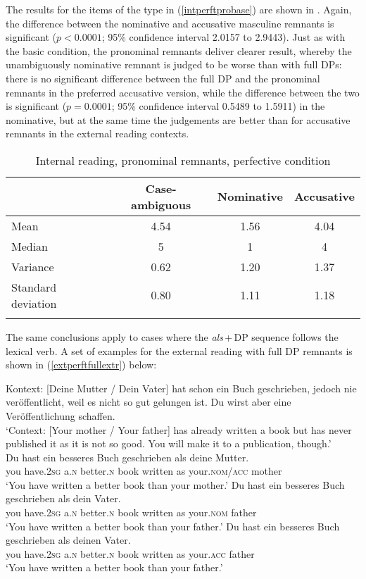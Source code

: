 The results for the items of the type in (\ref{intperftprobase}) are shown in .
Again, the difference between the nominative and accusative masculine remnants is significant ($p<0.0001$; 95\% confidence interval 2.0157 to 2.9443). Just as with the basic condition, the pronominal remnants deliver clearer result, whereby the unambiguously nominative remnant is judged to be worse than with full DPs: there is no significant difference between the full DP and the pronominal remnants in the preferred accusative version, while the difference between the two is significant ($p=0.0001$; 95\% confidence interval 0.5489 to 1.5911) in the nominative, but at the same time the judgements are better than for accusative remnants in the external reading contexts.  

\begin{table}
\begin{tabular}{l *3{S[table-format=1.2]}}
\lsptoprule
{} & {Case-ambiguous} & {Nominative} & {Accusative}\\
\midrule
Mean & 4.54 & 1.56 & 4.04\\
Median & 5 & 1 & 4\\
Variance & 0.62 & 1.20 & 1.37\\
Standard deviation & 0.80 & 1.11 & 1.18\\
\lspbottomrule
\end{tabular}
\caption{Internal reading, pronominal remnants, perfective condition}
\label{tableintperftprobase}
\end{table} 


The same conclusions apply to cases where the \textit{als}\,+\,DP sequence follows the lexical verb. A set of examples for the external reading with full DP remnants is shown in (\ref{extperftfullextr}) below:

\ea Kontext: [Deine Mutter / Dein Vater] hat schon ein Buch geschrieben, jedoch nie veröffentlicht, weil es nicht so gut gelungen ist. Du wirst aber eine Veröffentlichung schaffen. \label{extperftfullextr}\\
`Context: [Your mother / Your father] has already written a book but has never published it as it is not so good. You will make it to a publication, though.'\\
\ea \gll Du hast ein besseres Buch geschrieben als deine Mutter. \label{extperftfullextrambig}\\
you have.\textsc{2sg} a.\textsc{n} better.\textsc{n} book written as your.\textsc{nom/acc} mother\\
\glt `You have written a better book than your mother.'
\ex \gll Du hast ein besseres Buch geschrieben als dein Vater. \label{extperftfullextrnom}\\
you have.\textsc{2sg} a.\textsc{n} better.\textsc{n} book written as your.\textsc{nom} father\\
\glt `You have written a better book than your father.'
\ex \gll Du hast ein besseres Buch geschrieben als deinen Vater. \label{extperftfullextracc}\\
you have.\textsc{2sg} a.\textsc{n} better.\textsc{n} book written as your.\textsc{acc} father\\
\glt `You have written a better book than your father.'
\z
\z


